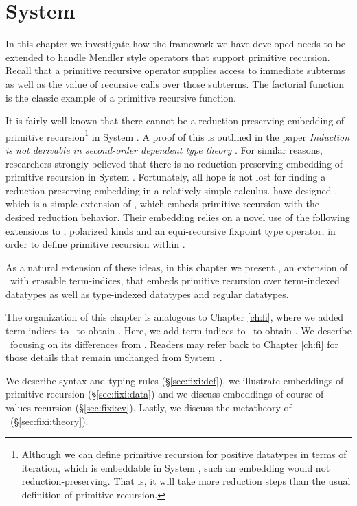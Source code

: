 \chapter{System \Fixi}\label{ch:fixi}
In this chapter we investigate how the framework we have developed
needs to be extended to handle Mendler style operators that support
primitive recursion. Recall that a primitive recursive operator supplies
access to immediate subterms as well as the value of recursive calls over
those subterms. The factorial function is the classic example of
a primitive recursive function.

It is fairly well known that there cannot be a reduction-preserving embedding
of primitive recursion\footnote{
	Although we can define primitive recursion for positive datatypes
	in terms of iteration, which is embeddable in System \F, such an
	embedding would not reduction-preserving. That is, it will take
	more reduction steps than the usual definition of primitive recursion.}
in System \F. A proof of this is outlined in the paper 
{\it Induction is not derivable in second-order dependent type theory}
\cite{Geuvers01}. For similar reasons, researchers strongly believed that
there is no reduction-preserving embedding of primitive recursion 
in System \Fw. Fortunately, all hope is not lost for finding
a reduction preserving embedding in a relatively simple calculus. 
\citet{AbeMat04} have designed \Fixw, which is a simple extension of \Fw,
which embeds primitive recursion with the desired reduction behavior.
Their embedding relies on a novel use of the following extensions to \Fw,
polarized kinds and an equi-recursive fixpoint type operator,
in order to define primitive recursion within \Fixw.

As a natural extension of these ideas, in this chapter we present \Fixi,
an extension of \Fixw\ with erasable term-indices, that embeds
primitive recursion over term-indexed datatypes as well as
type-indexed datatypes and regular datatypes.

The organization of this chapter is analogous to Chapter \ref{ch:fi},
where we added term-indices to \Fw\ to obtain \Fi. Here, we add
term indices to \Fixw\ to obtain \Fixi. We describe \Fixi\ focusing on
its differences from \Fi. Readers may refer back to Chapter \ref{ch:fi}
for those details that remain unchanged from System~\Fi.

We describe syntax and typing rules (\S\ref{sec:fixi:def}),
we illustrate embeddings of primitive recursion (\S\ref{sec:fixi:data})
and we discuss embeddings of course-of-values recursion (\S\ref{sec:fixi:cv}).
Lastly, we discuss the metatheory of \Fixi\ (\S\ref{sec:fixi:theory}).





